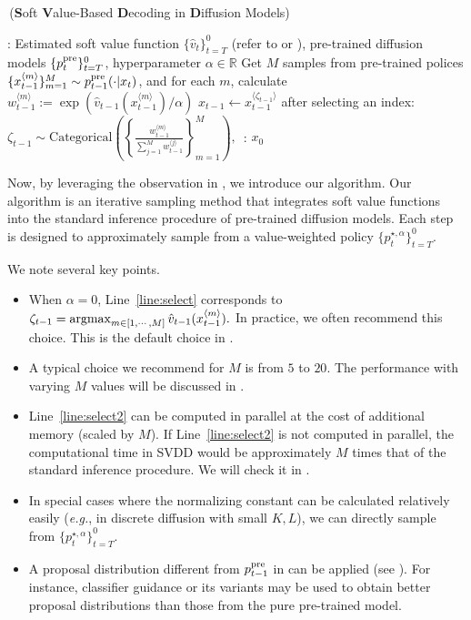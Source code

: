 \begin{algorithm}[!th]
\caption{\alg\,(\textbf{S}oft \textbf{V}alue-Based \textbf{D}ecoding in \textbf{D}iffusion Models)}\label{alg:decoding}
\begin{algorithmic}[1]
     : Estimated soft value function $\{\hat v_t\}_{t=T}^0$ (refer to  or ), pre-trained diffusion models $\{p^{\mathrm{pre}}_t\}_{t=T}^0$, hyperparameter $\alpha \in \mathbb{R}$
       \STATE  Get $M$ samples from pre-trained polices $\{x^{\langle m \rangle}_{t-1}\}_{m=1}^{M} \sim p^{\mathrm{pre}}_{t-1}(\cdot| x_{t}) $, and for each $m$, calculate  $ w^{\langle m \rangle}_{t-1}:= \exp(\hat v_{t-1}(x^{\langle m \rangle}_{t-1})/\alpha)$ \label{line:select2}
        \STATE $ x_{t-1}   \leftarrow  x^{\langle \zeta_{t-1} \rangle }_{t-1} $ after selecting an index: $ \zeta_{t-1}  \sim \mathrm{Categorical}\left ( \left \{\frac{w^{\langle m \rangle}_{t-1}}{\sum_{j=1}^{M} w^{\langle j \rangle}_{t-1} } \right \}_{m=1}^{M} \right),\,$ \label{line:select}
     \ENDFOR
  : $x_0$
\end{algorithmic}
\end{algorithm}


Now, by leveraging the observation in , we introduce our algorithm. Our algorithm is an iterative sampling method that integrates soft value functions into the standard inference procedure of pre-trained diffusion models. Each step is designed to approximately sample from a value-weighted policy $\{p^{\star,\alpha}_t\}_{t=T}^0$. 

We note several key points.
\begin{itemize}[leftmargin=*]
    \item When $\alpha= 0$, Line~\ref{line:select} corresponds to $
    \zeta_{t-1} = \mathop{\mathrm{argmax}}_{m \in [1,\cdots,M]}\hat v_{t-1}(x^{\langle m \rangle}_{t-1}). $
 In practice, we often recommend this choice. This is the default choice in . 
\item A typical choice we recommend for $M$ is from $5$ to $20$. The performance with varying $M$ values will be discussed in . 
\item  { Line~\ref{line:select2} can be computed in parallel at the cost of additional memory (scaled by $M$). If Line~\ref{line:select2} is not computed in parallel, the computational time in SVDD would be approximately $M$ times that of the standard inference procedure. We will check it in .  } 
\item In special cases where the normalizing constant can be calculated relatively easily (\textit{e.g.}, in discrete diffusion with small $K,L$), we can directly sample from $\{p^{\star,\alpha}_t\}_{t=T}^0$. 
\item { A proposal distribution different from $p^{\mathrm{pre}}_{t-1}$ in  can be applied (see ). For instance, classifier guidance or its variants may be used to obtain better proposal distributions than those from the pure pre-trained model.
} 
\end{itemize}


